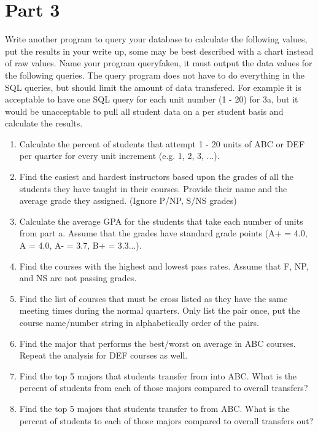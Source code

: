 \documentclass{article}
\begin{document}
\section*{Part 3}
Write another program to query your database to calculate the following values, put the results in your write up, some may be best described with a chart instead of raw values.
Name your program queryfakeu, it must output the data values for the following queries.
The query program does not have to do everything in the SQL queries, but should limit the amount of data transfered.
For example it is acceptable to have one SQL query for each unit number (1 - 20) for 3a, but it would be unacceptable to pull all student data on a per student basis and calculate the results.
\begin{enumerate}[label=\alph*.]
\item Calculate the percent of students that attempt 1 - 20 units of ABC or DEF per quarter for every unit increment (e.g. 1, 2, 3, ...). \\
 \clearpage
\item Find the easiest and hardest instructors based upon the grades of all the students they have taught in their courses. Provide their name and the average grade they assigned. (Ignore P/NP, S/NS grades) \\
 \clearpage
\item Calculate the average GPA for the students that take each number of units from part a. Assume that the grades have standard grade points (A+ = 4.0, A = 4.0, A- = 3.7, B+ = 3.3...). \\
 \clearpage
\item Find the courses with the highest and lowest pass rates. Assume that F, NP, and NS are not passing grades. \\
 \clearpage
\item Find the list of courses that must be cross listed as they have the same meeting times during the normal quarters. Only list the pair once, put the course name/number string in alphabetically order of the pairs. \\
 \clearpage
\item Find the major that performs the best/worst on average in ABC courses. Repeat the analysis for DEF courses as well. \\
 \clearpage
\item Find the top 5 majors that students transfer from into ABC. What is the percent of students from each of those majors compared to overall transfers? \\
 \clearpage
\item Find the top 5 majors that students transfer to from ABC. What is the percent of students to each of those majors compared to overall transfers out? \\
 \clearpage
\end{enumerate}
\end{document}
